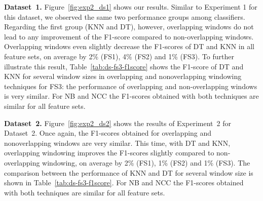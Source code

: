 \noindent\textbf{Dataset~1.} Figure~\ref{fig:exp2_ds1} shows our results. Similar to Experiment 1 for this dataset, we observed the same two performance groups among classifiers. Regarding the first group (KNN and DT), however, overlapping windows do not lead to any improvement of the F1-score compared to non-overlapping windows. Overlapping windows even slightly decrease the F1-scores of DT and KNN in all feature sets, on average by 2\% (FS1), 4\% (FS2) and 1\% (FS3). To further illustrate this result, Table~\ref{tab:ds-fs3-f1score} shows the F1-score of DT and KNN for several window sizes in overlapping and nonoverlapping windowing techniques for FS3: the performance of overlapping and non-overlapping windows is very similar.  For NB and NCC the F1-scores obtained with both techniques are similar for all feature sets.

\noindent\textbf{Dataset~2.} Figure~\ref{fig:exp2_ds2} shows the results of Experiment~2 for Dataset~2. Once again, the F1-scores obtained for overlapping and nonoverlapping windows are very similar.
This time, with DT and KNN, overlapping windowing improves the F1-scores slightly compared to non-overlapping windowing, on average by 2\% (FS1), 1\% (FS2) and 1\% (FS3). The comparison between the performance of KNN and DT for several window size is shown in Table~\ref{tab:ds-fs3-f1score}. For NB and NCC the F1-scores obtained with both techniques are similar for all feature sets.

